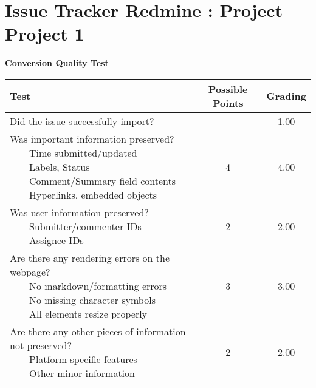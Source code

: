 \documentclass{article}
\newcommand{\tabitem}{~~\llap{\textbullet}~~}
\begin{document}
\\\section{Issue Tracker Redmine : Project Project 1}
\textbf{Conversion Quality Test}\\
\begin{adjustbox}{center}
	\renewcommand{\arraystretch}{1.5}
	\begin{tabular}{ p{6cm} | c | c }
		Test & Possible Points & Grading \\ \hline
		Did the issue successfully import? & - & 1.00 \\
		\hline
		\makecell[l]{
			Was important information preserved? \\
			\tabitem Time submitted/updated \\
			\tabitem Labels, Status \\
			\tabitem Comment/Summary field contents \\
			\tabitem Hyperlinks, embedded objects}
		& 4 & 4.00 \\
		\hline
		\makecell[l]{
			Was user information preserved? \\
			\tabitem Submitter/commenter IDs \\
			\tabitem Assignee IDs
		} & 2 & 2.00 \\
		\hline
		\makecell[{{p{6cm}}}]{
			Are there any rendering errors on the webpage? \\
			\tabitem No markdown/formatting errors \\
			\tabitem No missing character symbols \\
			\tabitem All elements resize properly
		} & 3 & 3.00 \\
		\hline
		\makecell[{{p{6cm}}}]{
			Are there any other pieces of information not preserved? \\
			\tabitem Platform specific features \\
			\tabitem Other minor information
		} & 2 & 2.00 \\
	\end{tabular}
\end{adjustbox}
\\
\end{document}
